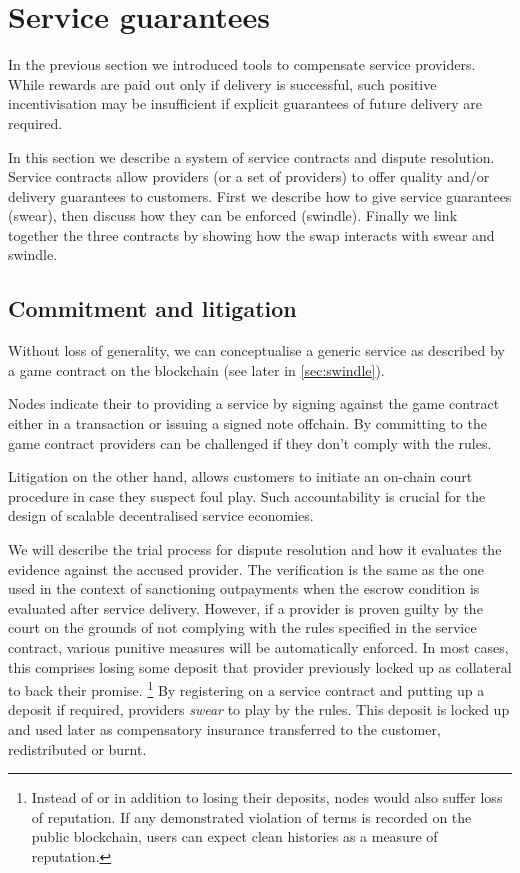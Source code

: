 \section{Service guarantees}
\label{sec:courtroom}

In the previous section we introduced tools to compensate service providers.
While rewards are paid out only if delivery is successful, such positive incentivisation may be insufficient if explicit guarantees of future delivery are required.

In this section we describe a system of service contracts and dispute resolution.
Service contracts allow providers (or a set of providers) to offer quality and/or delivery guarantees to customers. First we describe how to give service guarantees (swear), then discuss how they can be enforced (swindle). Finally we link together the three contracts by showing how the swap interacts with swear and swindle.


\subsection{Commitment and litigation}

Without loss of generality, we can conceptualise a generic service as described by a game contract on the blockchain (see later in \ref{sec:swindle}).


Nodes indicate their  to providing a service by signing against the game contract either in a transaction or issuing a signed note offchain. By committing to the game contract  providers can be challenged if they don't comply with the rules.

Litigation on the other hand, allows customers to initiate an on-chain court procedure in case they suspect foul play. Such accountability is crucial for the design of scalable decentralised service economies.

We will describe the trial process for dispute resolution and how it evaluates the evidence against the accused provider. The verification is the same as the one used in the context of sanctioning outpayments when the escrow condition is evaluated after service delivery. However, if a provider is proven guilty by the court on the grounds of not complying with the rules specified in the service contract, various punitive measures will be automatically enforced. In most cases, this comprises losing some deposit that provider previously locked up as collateral to back their promise.%
%
\footnote{Instead of or in addition to losing their deposits, nodes would also suffer loss of reputation. If any demonstrated violation of terms is recorded on the public blockchain, users can expect clean histories as a measure of reputation.}
%
By registering on a service contract and putting up a deposit if required, providers \emph{swear} to play by the rules. This deposit is locked up and used later as compensatory insurance transferred to the customer, redistributed or burnt.

